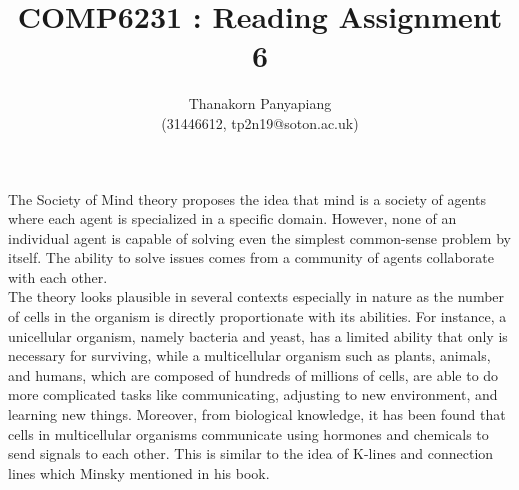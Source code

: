 \documentclass{article}
\title{COMP6231 : Reading Assignment 6}
\author{Thanakorn Panyapiang\\
(31446612, tp2n19@soton.ac.uk)}
\date{}
\begin{document}
\maketitle

The Society of Mind theory proposes the idea that mind is a society of agents where each agent is specialized in a specific domain. However, none of an individual agent is capable of solving even the simplest common-sense problem by itself. The ability to solve issues comes from a community of agents collaborate with each other.\\
\indent The theory looks plausible in several contexts especially in nature as the number of cells in the organism is directly proportionate with its abilities. For instance, a unicellular organism, namely bacteria and yeast, has a limited ability that only is necessary for surviving, while a multicellular organism such as plants, animals, and humans, which are composed of hundreds of millions of cells, are able to do more complicated tasks like communicating, adjusting to new environment, and learning new things. Moreover, from biological knowledge, it has been found that cells in multicellular organisms communicate using hormones and chemicals to send signals to each other. This is similar to the idea of K-lines and connection lines which Minsky mentioned in his book.
\end{document}
